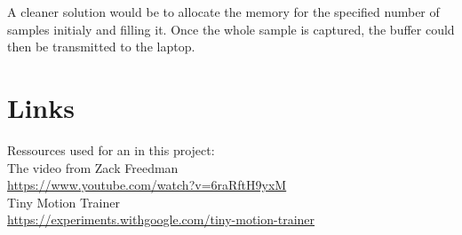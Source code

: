 \documentclass[a4paper,titlepage]{article}
\begin{document}
A cleaner solution would be to allocate the memory for the specified number of samples initialy and filling it.
Once the whole sample is captured, the buffer could then be transmitted to the laptop.

\newpage
\section{Links}

Ressources used for an in this project: \\

The video from Zack Freedman \\
\href{https://www.youtube.com/watch?v=6raRftH9yxM}{https://www.youtube.com/watch?v=6raRftH9yxM} \\

Tiny Motion Trainer \\
\href{https://experiments.withgoogle.com/tiny-motion-trainer}{https://experiments.withgoogle.com/tiny-motion-trainer} \\
\end{document}
